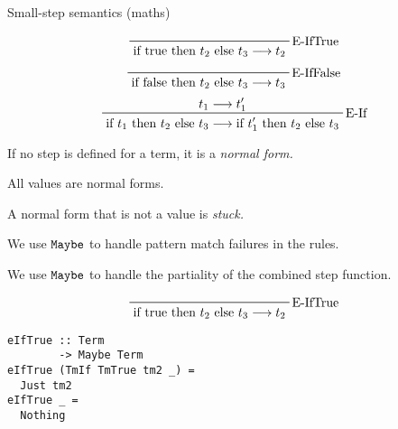 \documentclass[aspectration=169]{beamer}
\begin{document}
\begin{frame}[c]
  \begin{center}
Small-step semantics (maths)
  \end{center}
  \begin{displaymath}
    \prftree[r]{E-IfTrue}
    {\text{if true then $t_2$ else $t_3$} \longrightarrow t_2}
  \end{displaymath}
  \begin{displaymath}
    \prftree[r]{E-IfFalse}
    {\text{if false then $t_2$ else $t_3$} \longrightarrow t_3}
  \end{displaymath}
  \begin{displaymath}
    \prftree[r]{E-If}
    {t_1 \longrightarrow t_1^{\prime}}
    {\text{if $t_1$ then $t_2$ else $t_3$} \longrightarrow \text{if $t_1^{\prime}$ then $t_2$ else $t_3$}}
  \end{displaymath}
\end{frame}

\begin{frame}[c]
  \begin{center}
If no step is defined for a term, it is a \em{normal form}.
  \end{center}
\end{frame}

\begin{frame}[c]
  \begin{center}
All values are normal forms.
  \end{center}
\end{frame}

\begin{frame}[c]
  \begin{center}
A normal form that is not a value is \em{stuck}.
  \end{center}
\end{frame}

\begin{frame}[c]
  \begin{center}
We use $\tt{Maybe}$ to handle pattern match failures in the rules.
  \end{center}
\end{frame}

\begin{frame}[c]
  \begin{center}
We use $\tt{Maybe}$ to handle the partiality of the combined step function.
  \end{center}
\end{frame}

\begin{frame}[fragile]
  \begin{displaymath}
    \prftree[r]{E-IfTrue}
    {\text{if true then $t_2$ else $t_3$} \longrightarrow t_2}
  \end{displaymath}
  \begin{verbatim}
eIfTrue :: Term 
        -> Maybe Term
eIfTrue (TmIf TmTrue tm2 _) =
  Just tm2
eIfTrue _ =
  Nothing
  \end{verbatim}
\end{frame}
\end{document}
